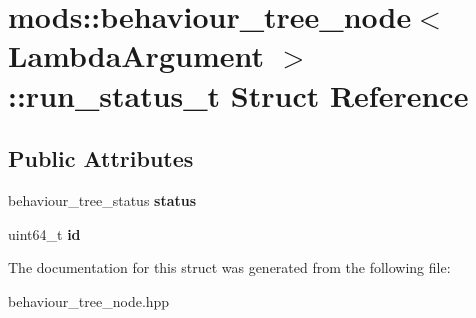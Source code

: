 \hypertarget{structmods_1_1behaviour__tree__node_1_1run__status__t}{}\section{mods\+:\+:behaviour\+\_\+tree\+\_\+node$<$ Lambda\+Argument $>$\+:\+:run\+\_\+status\+\_\+t Struct Reference}
\label{structmods_1_1behaviour__tree__node_1_1run__status__t}
\subsection*{Public Attributes}
\begin{DoxyCompactItemize}
\item 
\mbox{\label{structmods_1_1behaviour__tree__node_1_1run__status__t_a77bc42bf022c7b0464675e5d9d0e5b0c}} 
behaviour\+\_\+tree\+\_\+status {\bfseries status}
\item 
\mbox{\label{structmods_1_1behaviour__tree__node_1_1run__status__t_add5ab50e635046ed3d9b196bd6dcf108}} 
uint64\+\_\+t {\bfseries id}
\end{DoxyCompactItemize}


The documentation for this struct was generated from the following file\+:\begin{DoxyCompactItemize}
\item 
behaviour\+\_\+tree\+\_\+node.\+hpp\end{DoxyCompactItemize}
